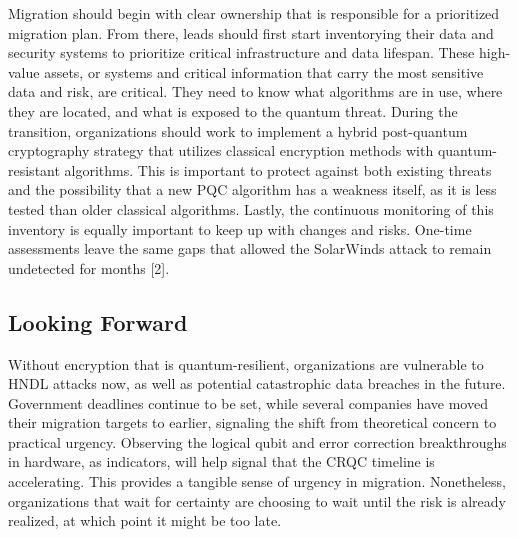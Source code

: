 \documentclass{article}
\begin{document}
Migration should begin with clear ownership that is responsible for a prioritized migration plan. From there, leads should first start inventorying their data and security systems to prioritize critical infrastructure and data lifespan. These high-value assets, or systems and critical information that carry the most sensitive data and risk, are critical. They need to know what algorithms are in use, where they are located, and what is exposed to the quantum threat. During the transition, organizations should work to implement a hybrid post-quantum cryptography strategy that utilizes classical encryption methods with quantum-resistant algorithms. This is important to protect against both existing threats and the possibility that a new PQC algorithm has a weakness itself, as it is less tested than older classical algorithms. Lastly, the continuous monitoring of this inventory is equally important to keep up with changes and risks. One-time assessments leave the same gaps that allowed the SolarWinds attack to remain undetected for months [2]. 

\subsection{Looking Forward}

Without encryption that is quantum-resilient, organizations are vulnerable to HNDL attacks now, as well as potential catastrophic data breaches in the future. Government deadlines continue to be set, while several companies have moved their migration targets to earlier, signaling the shift from theoretical concern to practical urgency. Observing the logical qubit and error correction breakthroughs in hardware, as indicators, will help signal that the CRQC timeline is accelerating. This provides a tangible sense of urgency in migration. Nonetheless, organizations that wait for certainty are choosing to wait until the risk is already realized, at which point it might be too late. 
\end{document}

